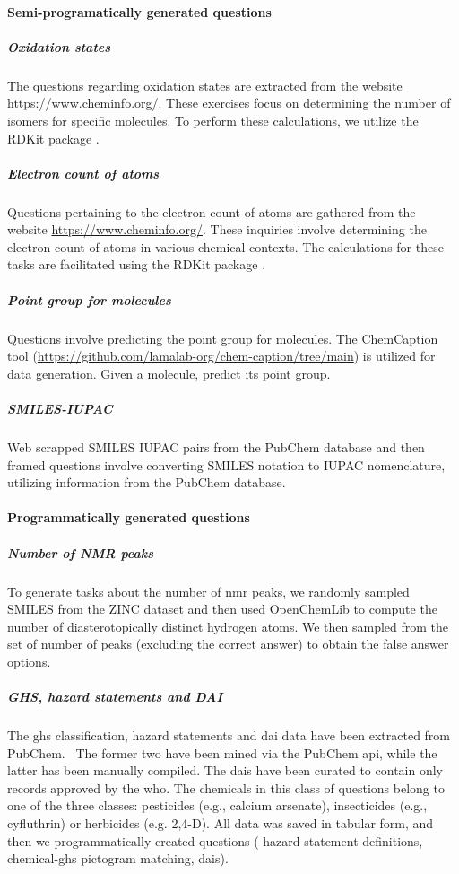 \documentclass[11pt, oneside]{article}
\begin{document}
\paragraph{Semi-programatically generated questions}

\subparagraph{Oxidation states}
The questions regarding oxidation states are extracted from the website \url{https://www.cheminfo.org/}. These exercises focus on determining the number of isomers for specific molecules. To perform these calculations, we utilize the RDKit package \cite{bento2020open}.
\subparagraph{Electron count of atoms}
Questions pertaining to the electron count of atoms are gathered from the website \url{https://www.cheminfo.org/}. These inquiries involve determining the electron count of atoms in various chemical contexts. The calculations for these tasks are facilitated using the RDKit package \cite{bento2020open}.
\subparagraph{Point group for molecules}
Questions involve predicting the point group for molecules. The ChemCaption tool (\url{https://github.com/lamalab-org/chem-caption/tree/main}) is utilized for data generation. Given a molecule, predict its point group.
\subparagraph{SMILES-IUPAC}
Web scrapped SMILES IUPAC pairs from the PubChem database \cite{pubchem} and then framed questions involve converting SMILES notation to IUPAC nomenclature, utilizing information from the PubChem database.

\paragraph{Programmatically generated questions}
\subparagraph{Number of NMR peaks} To generate tasks about the number of \gls{nmr} peaks, we randomly sampled SMILES from the ZINC dataset and then used OpenChemLib\cite{openchemlib} to compute the number of diasterotopically distinct hydrogen atoms.
We then sampled from the set of number of peaks (excluding the correct answer) to obtain the false answer options.

\subparagraph{GHS, hazard statements and DAI}
The \gls{ghs} classification, hazard statements and \gls{dai} data have been extracted from PubChem.~\cite{pubchem}
The former two have been mined via the PubChem \gls{api}, while the latter has been manually compiled.
The \glspl{dai} have been curated to contain only records approved by the \gls{who}.
The chemicals in this class of questions belong to one of the three classes: pesticides (e.g., calcium arsenate), insecticides (e.g., cyfluthrin) or herbicides (e.g. 2,4-D).
All data was saved in tabular form, and then we programmatically created questions ( hazard statement definitions,  chemical-\gls{ghs} pictogram matching,  \glspl{dai}).
\end{document}
